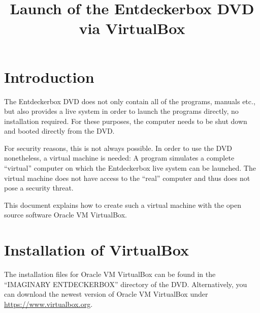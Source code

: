 \documentclass[a4paper,10pt,BCOR=0mm,DIV=14]{scrartcl}
\title{Launch of the Entdeckerbox DVD via VirtualBox}
\newcommand{\command}[1]{\textsf{\enquote{#1}}}
\begin{document}
\maketitle

\section{Introduction}
The Entdeckerbox DVD does not only contain all of the programs, manuals etc., but also provides a live system in order to launch the programs directly, no installation required. For these purposes, the computer needs to be shut down and booted directly from the DVD. 


For security reasons, this is not always possible. In order to use the DVD nonetheless, a virtual machine is needed: A program simulates a complete \enquote{virtual} computer on which the Entdeckerbox live system can be launched. The virtual machine does not have access to the \enquote{real} computer and thus does not pose a security threat. 


This document explains how to create such a virtual machine with the open source software Oracle VM VirtualBox. 




\section{Installation of VirtualBox}
The installation files for Oracle VM VirtualBox can be found in the \command{IMAGINARY ENTDECKERBOX} directory of the DVD. Alternatively, you can download the newest version of Oracle VM VirtualBox under \url{https://www.virtualbox.org}. 
\end{document}

